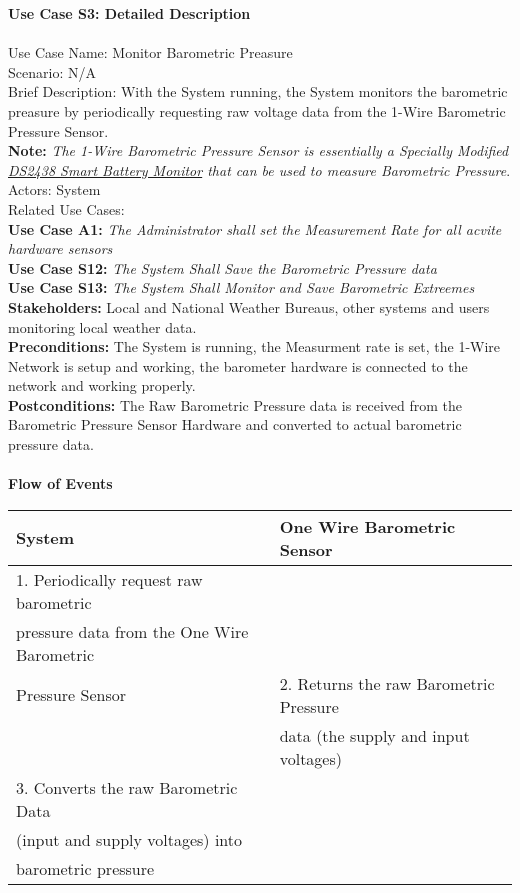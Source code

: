 \documentclass[letterpaper]{article}
\begin{document}
\noindent
\textbf{Use Case S3:  Detailed Description}\\\\
Use Case Name:  Monitor Barometric Preasure\\
Scenario:  N/A\\
Brief Description:  With the System running, the System monitors the
barometric preasure by periodically requesting raw voltage data from
the 1-Wire Barometric Pressure Sensor.\\
\textbf{Note: }\emph{The 1-Wire Barometric Pressure Sensor is
essentially a Specially Modified \underline{DS2438 Smart Battery
Monitor} that can be used to measure Barometric Pressure}.\\
Actors:  System\\
Related Use Cases:\\
\textbf{Use Case A1:  }\emph{The Administrator shall set the
Measurement Rate for all acvite hardware sensors}\\
\textbf{Use Case S12:  }\emph{The System Shall Save the Barometric
Pressure data}\\
\textbf{Use Case S13:  }\emph{The System Shall Monitor and Save
Barometric Extreemes}\\
\textbf{Stakeholders:  } Local and National Weather Bureaus, other
systems and users monitoring local weather data.\\
\textbf{Preconditions:  } The System is running, the Measurment rate
is set, the 1-Wire Network is setup and working, the barometer
hardware is connected to the network and working properly.\\
\textbf{Postconditions: } The Raw Barometric Pressure data is
received from the Barometric Pressure Sensor Hardware and converted
to actual barometric pressure data.\\\\
\textbf{Flow of Events}\\
\begin{tabular}{|l|l|}\hline
\textbf{System} & \textbf{One Wire Barometric Sensor}\\\hline
1.  Periodically request raw barometric  & \\
pressure data from the One Wire Barometric & \\ Pressure
Sensor & 2.  Returns the raw Barometric Pressure \\ &  data
(the supply and input voltages)\\\hline
3.  Converts the raw Barometric Data & \\
(input and supply voltages) into & \\
barometric pressure & \\\hline
\end{tabular}
\end{document}

